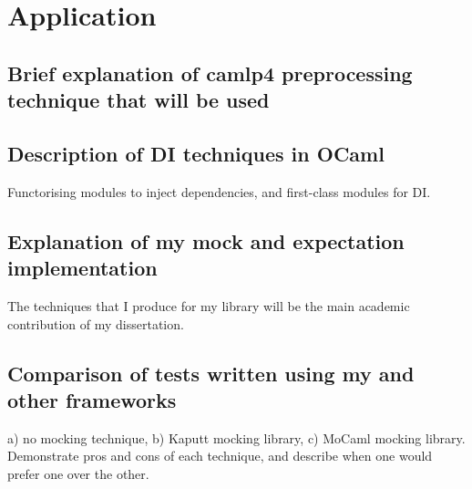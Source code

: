 \chapter{Application}
\label{application}

\section{Brief explanation of camlp4 preprocessing technique that will be used}


\section{Description of DI techniques in OCaml}

Functorising modules to inject dependencies, and first-class modules
for DI.

\section{Explanation of my mock and expectation implementation}

The techniques that I produce for my library will be the main academic
contribution of my dissertation.

\section{Comparison of tests written using my and other frameworks}

a) no mocking technique, b) Kaputt mocking library, c) MoCaml mocking
library. Demonstrate pros and cons of each technique, and describe
when one would prefer one over the other.
